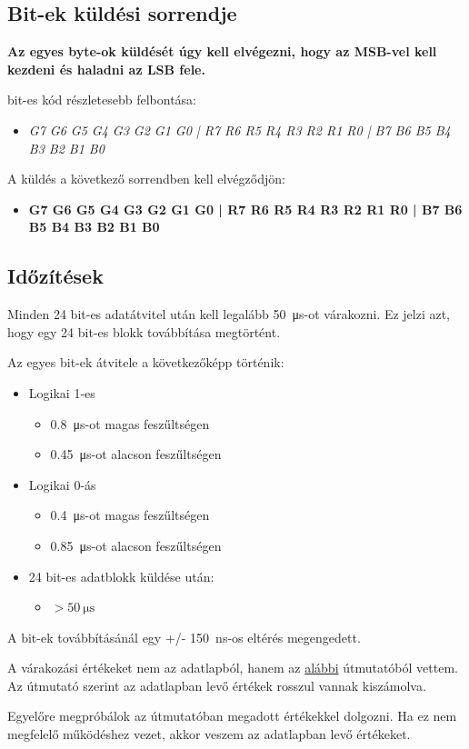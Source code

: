 \documentclass[10pt]{article} %
\begin{document}
\subsection{Bit-ek küldési sorrendje}

\textbf{Az egyes byte-ok küldését úgy kell elvégezni, hogy az MSB-vel kell kezdeni és haladni az LSB fele.}

 bit-es kód részletesebb felbontása: 
\begin{itemize}
\item \textit{G7 G6 G5 G4 G3 G2 G1 G0 | R7 R6 R5 R4 R3 R2 R1 R0 | B7 B6 B5 B4 B3 B2 B1 B0}
\end{itemize}

\noindent A küldés a következő sorrendben kell elvégződjön: 
\begin{itemize}
\item \textbf{G7 G6 G5 G4 G3 G2 G1 G0 | R7 R6 R5 R4 R3 R2 R1 R0 | B7 B6 B5 B4 B3 B2 B1 B0}
\end{itemize}

\subsection{Időzítések}

Minden 24 bit-es adatátvitel után kell legalább \SI{50}{\micro\second}-ot várakozni. Ez jelzi azt, hogy egy 24 bit-es blokk továbbítása megtörtént.

\noindent Az egyes bit-ek átvitele a következőképp történik:

\begin{itemize}
\item Logikai 1-es
	\begin{itemize}
	\item \SI{0.8}{\micro\second}-ot magas feszűltségen
	\item \SI{0.45}{\micro\second}-ot alacson feszűltségen
	\end{itemize}
\item Logikai 0-ás
	\begin{itemize}
	\item \SI{0.4}{\micro\second}-ot magas feszűltségen
	\item \SI{0.85}{\micro\second}-ot alacson feszűltségen
	\end{itemize}
\item 24 bit-es adatblokk küldése után: 
	\begin{itemize}
		\item $ > \SI{50}{\micro\second}$
	\end{itemize}
\end{itemize}

\noindent A bit-ek továbbításánál egy +/- \SI{150}{\nano\second}-os eltérés megengedett.

A várakozási értékeket nem az adatlapból, hanem az \href{https://learn.adafruit.com/adafruit-neopixel-uberguide}{alábbi} útmutatóból vettem. Az útmutató szerint az adatlapban levő értékek rosszul vannak kiszámolva.

Egyelőre megpróbálok az útmutatóban megadott értékekkel dolgozni. Ha ez nem megfelelő működéshez vezet, akkor veszem az adatlapban levő értékeket.
\end{document}

